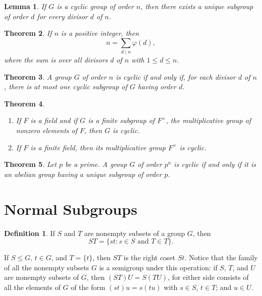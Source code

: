 \documentclass[12pt]{report}
\newtheorem{theorem}{Theorem}[chapter]
\newtheorem{lemma}[theorem]{Lemma}
\theoremstyle{definition}
\newtheorem*{definition}{Definition}
\renewcommand{\labelenumi}{\textnormal{(\roman{enumi})}}
\begin{document}
\begin{lemma}
	If $G$ is a cyclic group of order $n$, then there exists a unique subgroup of order $d$ for every divisor $d$ of $n$.
\end{lemma}

\begin{theorem}
	If $n$ is a positive integer, then
	\[ n=\sum_{d\mid n} \varphi(d), \]
	where the sum is over all divisors $d$ of $n$ with $1\leq d\leq n$.
\end{theorem}

\begin{theorem}
	A group $G$ of order $n$ is cyclic if and only if, for each divisor $d$ of $n$, there is at most one cyclic subgroup of $G$ having order $d$.
\end{theorem}

\begin{theorem}
	\quad
	\renewcommand{\labelenumi}{\textnormal{(\roman{enumi})}}
	\begin{enumerate}
		\item If $F$ is a field and if $G$ is a finite subgroup of $F^\times$, the multiplicative group of nonzero elements of $F$, then $G$ is cyclic.
		\item If $F$ is a finite field, then its multiplicative group $F^\times$ is cyclic.
	\end{enumerate}
\end{theorem}

\begin{theorem}
	Let $p$ be a prime. A group $G$ of order $p^n$ is cyclic if and only if it is an abelian group having a unique subgroup of order $p$.
\end{theorem}


\section{Normal Subgroups}

\begin{definition}
	If $S$ and $T$ are nonempty subsets of a group $G$, then \[ ST=\{st:s\in S\text{ and }T\in T\}.\]\par
	If $S\leq G$, $t\in G$, and $T=\{t\}$, then $ST$ is the right coset $St$.
	Notice that the family of all the nonempty subsets $G$ is a semigroup under this operation: if $S$, $T$, and $U$ are nonempty subsets of $G$,
	then $(ST)U=S(TU)$, for either side consists of all the elements of $G$ of the form $(st)u=s(tu)$ with $s\in S$, $t\in T$; and $u\in U$.
\end{definition}
\end{document}
